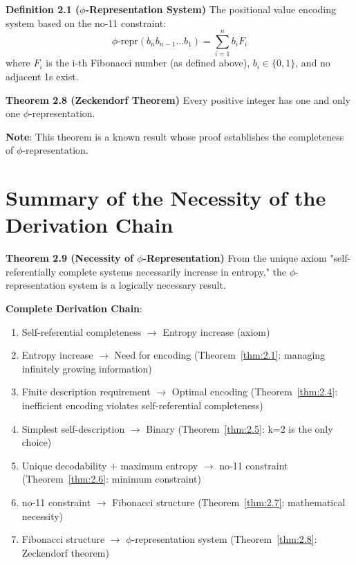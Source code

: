 \textbf{Definition 2.1 ($\phi$-Representation System)}
\label{def:2.1}
The positional value encoding system based on the no-11 constraint:
\begin{equation}
\text{$\phi$-repr}(b_n b_{n-1}...b_1) = \sum_{i=1}^n b_i F_i
\end{equation}
where $F_i$ is the i-th Fibonacci number (as defined above), $b_i \in \{0,1\}$, and no adjacent 1s exist.

\textbf{Theorem 2.8 (Zeckendorf Theorem)}
\label{thm:2.8}
Every positive integer has one and only one $\phi$-representation.

\textbf{Note}: This theorem is a known result whose proof establishes the completeness of $\phi$-representation.

\section{Summary of the Necessity of the Derivation Chain}
\label{sec:ch02_encoding:summary-of-the-necessity-of-the-derivation-chain}

\textbf{Theorem 2.9 (Necessity of $\phi$-Representation)}
\label{thm:2.9}
From the unique axiom "self-referentially complete systems necessarily increase in entropy," the $\phi$-representation system is a logically necessary result.

\textbf{Complete Derivation Chain}:
\begin{enumerate}
\item Self-referential completeness $\rightarrow$ Entropy increase (axiom)
\item Entropy increase $\rightarrow$ Need for encoding (Theorem~\ref{thm:2.1}: managing infinitely growing information)
\item Finite description requirement $\rightarrow$ Optimal encoding (Theorem~\ref{thm:2.4}: inefficient encoding violates self-referential completeness)
\item Simplest self-description $\rightarrow$ Binary (Theorem~\ref{thm:2.5}: k=2 is the only choice)
\item Unique decodability + maximum entropy $\rightarrow$ no-11 constraint (Theorem~\ref{thm:2.6}: minimum constraint)
\item no-11 constraint $\rightarrow$ Fibonacci structure (Theorem~\ref{thm:2.7}: mathematical necessity)
\item Fibonacci structure $\rightarrow$ $\phi$-representation system (Theorem~\ref{thm:2.8}: Zeckendorf theorem)
\end{enumerate}

